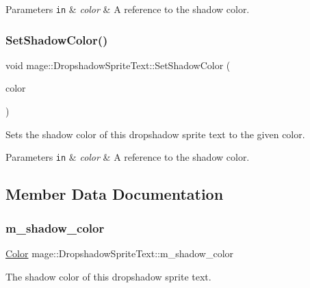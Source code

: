 \begin{DoxyParams}[1]{Parameters}
\mbox{\tt in}  & {\em color} & A reference to the shadow color. \\
\hline
\end{DoxyParams}
\hypertarget{classmage_1_1_dropshadow_sprite_text_a8069cb327cc61dd92d516c793d9c49e7}{}\label{classmage_1_1_dropshadow_sprite_text_a8069cb327cc61dd92d516c793d9c49e7} 
\subsubsection{\texorpdfstring{Set\+Shadow\+Color()}{SetShadowColor()}\hspace{0.1cm}{\footnotesize\ttfamily [2/2]}}
{\footnotesize\ttfamily void mage\+::\+Dropshadow\+Sprite\+Text\+::\+Set\+Shadow\+Color (\begin{DoxyParamCaption}\item[{const X\+M\+V\+E\+C\+T\+OR \&}]{color }\end{DoxyParamCaption})}

Sets the shadow color of this dropshadow sprite text to the given color.


\begin{DoxyParams}[1]{Parameters}
\mbox{\tt in}  & {\em color} & A reference to the shadow color. \\
\hline
\end{DoxyParams}


\subsection{Member Data Documentation}
\hypertarget{classmage_1_1_dropshadow_sprite_text_a6343fd2b2b2139d8a869c29a2a33531f}{}\label{classmage_1_1_dropshadow_sprite_text_a6343fd2b2b2139d8a869c29a2a33531f} 
\subsubsection{\texorpdfstring{m\+\_\+shadow\+\_\+color}{m\_shadow\_color}}
{\footnotesize\ttfamily \hyperlink{structmage_1_1_color}{Color} mage\+::\+Dropshadow\+Sprite\+Text\+::m\+\_\+shadow\+\_\+color\hspace{0.3cm}{\ttfamily [private]}}

The shadow color of this dropshadow sprite text. 